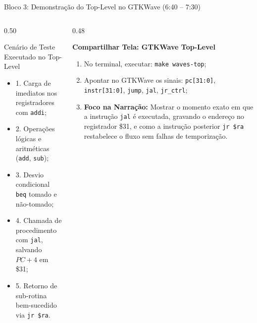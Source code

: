 \documentclass[aspectratio=169, 10pt]{beamer}
\begin{document}
\begin{frame}{Bloco 3: Demonstração do Top-Level no GTKWave (6:40 -- 7:30)}
  \begin{columns}[T]
    \begin{column}{0.50\textwidth}
      \begin{block}{Cenário de Teste Executado no Top-Level}
        \footnotesize
        \begin{itemize}\setlength{\itemsep}{1pt}
          \item 1. Carga de imediatos nos registradores com \texttt{addi};
          \item 2. Operações lógicas e aritméticas (\texttt{add}, \texttt{sub});
          \item 3. Desvio condicional \texttt{beq} tomado e não-tomado;
          \item 4. Chamada de procedimento com \texttt{jal}, salvando $PC+4$ em \$31;
          \item 5. Retorno de sub-rotina bem-sucedido via \texttt{jr \$ra}.
        \end{itemize}
      \end{block}
    \end{column}

    \begin{column}{0.48\textwidth}
      \begin{tcolorbox}[cuebox]
        \textbf{Compartilhar Tela: GTKWave Top-Level}
        \vspace{1mm}
        \scriptsize
        \begin{enumerate}\setlength{\itemsep}{1pt}
          \item No terminal, executar: \texttt{make waves-top};
          \item Apontar no GTKWave os sinais: \texttt{pc[31:0]}, \texttt{instr[31:0]}, \texttt{jump}, \texttt{jal}, \texttt{jr\_ctrl};
          \item \textbf{Foco na Narração:} Mostrar o momento exato em que a instrução \texttt{jal} é executada, gravando o endereço no registrador \$31, e como a instrução posterior \texttt{jr \$ra} restabelece o fluxo sem falhas de temporização.
        \end{enumerate}
      \end{tcolorbox}
    \end{column}
  \end{columns}
\end{frame}
\end{document}
